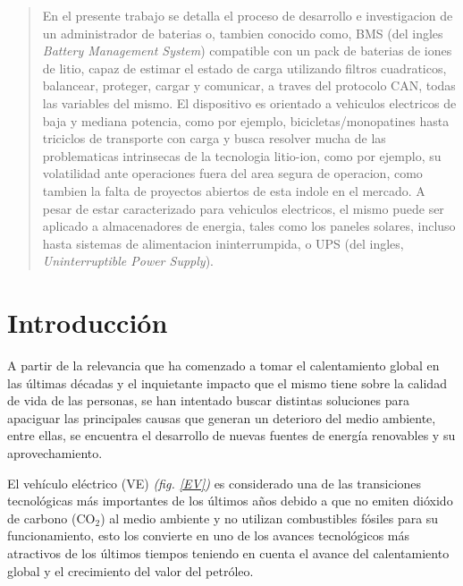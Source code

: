 \documentclass[10pt,a4paper]{article}
\begin{document}
    \begin{abstract}
        \noindent En el presente trabajo se detalla el proceso de desarrollo e
        investigacion de un administrador de baterias o, tambien conocido como,
        BMS (del ingles \emph{Battery Management System}) compatible con un pack
        de baterias de iones de litio, capaz de estimar el estado de carga 
        utilizando filtros cuadraticos, balancear, proteger, cargar y 
        comunicar, a traves del protocolo CAN, todas 
        las variables del mismo. El dispositivo es orientado a vehiculos 
        electricos de baja y mediana potencia, como por ejemplo, 
        bicicletas/monopatines hasta triciclos de transporte con carga
        y busca resolver mucha de las problematicas intrinsecas de 
        la tecnologia litio-ion, como por ejemplo, su volatilidad ante 
        operaciones fuera del area segura de operacion, 
        como tambien la falta de proyectos abiertos de esta indole en el mercado. 
        A pesar de estar caracterizado para vehiculos electricos, el mismo 
        puede ser aplicado a almacenadores de energia, tales como los paneles 
        solares, incluso hasta sistemas de alimentacion ininterrumpida, o UPS 
        (del ingles, \emph{Uninterruptible Power Supply}).
    \end{abstract}
	
    \clearpage

	\tableofcontents

    \clearpage

	\section{Introducción}
	
	\noindent A partir de la relevancia que ha comenzado a tomar el 
    calentamiento global en las últimas décadas y el inquietante impacto que 
    el mismo tiene sobre la calidad de vida de las personas, se han intentado 
    buscar distintas soluciones para apaciguar las principales causas que 
    generan un deterioro del medio ambiente, entre ellas, se encuentra el 
    desarrollo de nuevas fuentes de energía renovables y su aprovechamiento.

    \noindent El vehículo eléctrico (VE) \emph{(fig. \ref{EV})} es considerado 
    una de las transiciones tecnológicas más importantes de los últimos años 
    debido a que no emiten dióxido de carbono ($\mathrm{CO_2}$) al medio 
    ambiente y no utilizan combustibles fósiles para su funcionamiento, esto 
    los convierte en uno de los avances tecnológicos más atractivos de los 
    últimos tiempos teniendo en cuenta el avance del calentamiento global y el 
    crecimiento del valor del petróleo.
\end{document}
